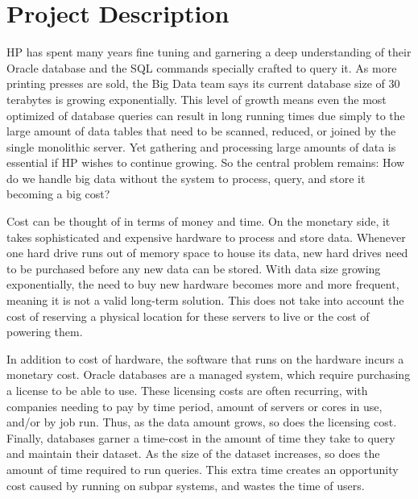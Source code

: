 \documentclass[onecolumn, draftclsnofoot,10pt, compsoc]{IEEEtran}
\begin{document}
\section{Project Description}
 HP has spent many years fine tuning and garnering a deep understanding of their Oracle database and the SQL commands specially crafted to query it. As more printing presses are sold, the Big Data team says its current database size of 30 terabytes is growing exponentially. This level of growth means even the most optimized of database queries can result in long running times due simply to the large amount of data tables that need to be scanned, reduced, or joined by the single monolithic server. Yet gathering and processing large amounts of data is essential if HP wishes to continue growing. So the central problem remains: How do we handle big data without the system to process, query, and store it becoming a big cost?


 Cost can be thought of in terms of money and time. On the monetary side, it takes sophisticated and expensive hardware to process and store data. Whenever one hard drive runs out of memory space to house its data, new hard drives need to be purchased before any new data can be stored. With data size growing exponentially, the need to buy new hardware becomes more and more frequent, meaning it is not a valid long-term solution. This does not take into account the cost of reserving a physical location for these servers to live or the cost of powering them. 


In addition to cost of hardware, the software that runs on the hardware incurs a monetary cost. Oracle databases are a managed system, which require purchasing a license to be able to use. These licensing costs are often recurring, with companies needing to pay by time period, amount of servers or cores in use, and/or by job run. Thus, as the data amount grows, so does the licensing cost. Finally, databases garner a time-cost in the amount of time they take to query and maintain their dataset. As the size of the dataset increases, so does the amount of time required to run queries. This extra time creates an opportunity cost caused by running on subpar systems, and wastes the time of users.
\end{document}
